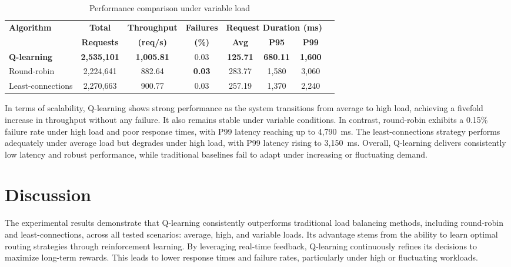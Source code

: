 \documentclass[lnbip]{svmultln}
\begin{document}
\begin{table}[htbp]
\centering
\caption{Performance comparison under variable load}
\setlength{\tabcolsep}{5pt}
\begin{tabular}{lccccccc}
\toprule
\textbf{Algorithm} & \textbf{Total} & \textbf{Throughput} & \textbf{Failures} & \multicolumn{3}{c}{\textbf{Request Duration (ms)}} \\
 & \textbf{Requests} & \textbf{(req/s)} & \textbf{(\%)} & \textbf{Avg} & \textbf{P95} & \textbf{P99} \\
\midrule
\textbf{Q-learning} & \textbf{2{,}535{,}101} & \textbf{1{,}005.81} & 0.03 & \textbf{125.71} & \textbf{680.11} & \textbf{1{,}600} \\
Round-robin & 2{,}224{,}641 & 882.64 & \textbf{0.03} & 283.77 & 1{,}580 & 3{,}060 \\
Least-connections & 2{,}270{,}663 & 900.77 & 0.03 & 257.19 & 1{,}370 & 2{,}240 \\
\bottomrule
\end{tabular}
\label{t:ex_3}
\end{table}

In terms of scalability, Q-learning shows strong performance as the system transitions from average to high load, achieving a fivefold increase in throughput without any failure. It also remains stable under variable conditions. In contrast, round-robin exhibits a 0.15\% failure rate under high load and poor response times, with P99 latency reaching up to 4{,}790~ms. The least-connections strategy performs adequately under average load but degrades under high load, with P99 latency rising to 3{,}150~ms.
Overall, Q-learning delivers consistently low latency and robust performance, while traditional baselines fail to adapt under increasing or fluctuating demand.

\section{Discussion}\label{s:6}
The experimental results demonstrate that Q-learning consistently outperforms traditional load balancing methods, including round-robin and least-connections, across all tested scenarios: average, high, and variable loads. Its advantage stems from the ability to learn optimal routing strategies through reinforcement learning. By leveraging real-time feedback, Q-learning continuously refines its decisions to maximize long-term rewards. This leads to lower response times and failure rates, particularly under high or fluctuating workloads.
\end{document}
